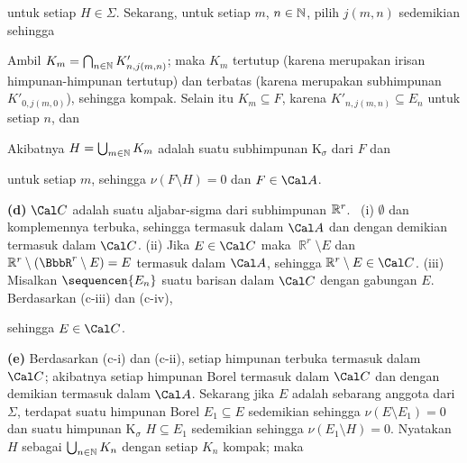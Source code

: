 {

\noindent untuk setiap $H\in\Sigma$.   Sekarang, untuk setiap $m$, $n\in\Bbb N$,
pilih $j(m,n)$ sedemikian sehingga


\noindent Ambil $K_m=\bigcap_{n\in\Bbb N}K'_{n,j(m,n)}$;  maka $K_m$
tertutup (karena merupakan irisan himpunan-himpunan tertutup) dan terbatas (karena merupakan
subhimpunan $K'_{0,j(m,0)}$), sehingga kompak.   Selain itu $K_m\subseteq F$,
karena $K'_{n,j(m,n)}\subseteq E_n$ untuk setiap $n$, dan


\noindent Akibatnya $H=\bigcup_{m\in\Bbb N}K_m$ adalah suatu subhimpunan K$_{\sigma}$
dari $F$ dan


\noindent untuk setiap $m$, sehingga $\nu(F\setminus H)=0$ dan $F\in\Cal A$.\ \Qed

\medskip

{\bf (d)} $\Cal C$ adalah suatu aljabar-sigma dari subhimpunan $\Bbb R^r$.
\Prf\ {(i)} $\emptyset$ dan komplemennya terbuka, sehingga termasuk dalam $\Cal
A$ dan dengan demikian termasuk dalam $\Cal C$.
{(ii)} Jika $E\in\Cal C$ maka $\BbbR^r\setminus E$ dan $\Bbb
R^r\setminus(\BbbR^r\setminus E)=E$ termasuk dalam $\Cal A$, sehingga $\Bbb
R^r\setminus E\in\Cal C$.   {(iii)} Misalkan $\sequencen{E_n}$ suatu
barisan dalam $\Cal C$ dengan gabungan $E$.   Berdasarkan (c-iii) dan (c-iv),


\noindent sehingga $E\in\Cal C$.\  \Qed

\medskip

{\bf (e)} Berdasarkan (c-i) dan (c-ii), setiap himpunan terbuka termasuk dalam $\Cal C$;
akibatnya setiap himpunan Borel
termasuk dalam $\Cal C$ dan dengan demikian termasuk dalam $\Cal A$.   Sekarang jika $E$ adalah sebarang
anggota
dari $\Sigma$, terdapat suatu himpunan Borel $E_1\subseteq E$ sedemikian sehingga
$\nu(E\setminus E_1)=0$ dan suatu himpunan K$_{\sigma}$ $H\subseteq E_1$ sedemikian
sehingga $\nu(E_1\setminus H)=0$.   Nyatakan $H$ sebagai $\bigcup_{n\in\Bbb N}K_n$
dengan setiap $K_n$ kompak;  maka

}
